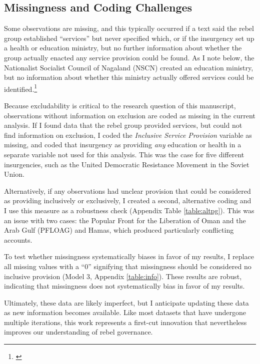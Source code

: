 \documentclass[12pt, letterpaper]{article}
\begin{document}
\subsection*{Missingness and Coding Challenges}  
Some observations are missing, and this typically occurred if a text said the rebel group established ``services'' but never specified which, or if the insurgency set up a health or education ministry, but no further information about whether the group actually enacted any service provision could be found. As I note below, the Nationalist Socialist Council of Nagaland (NSCN) created an education ministry, but no information about whether this ministry actually offered services could be identified.\footnote{\citealt{satp2014}} 

Because excludability is critical to the research question of this manuscript, observations without information on exclusion are coded as missing in the current analysis. If I found data that the rebel group provided services, but could not find information on exclusion, I coded the \textit{Inclusive Service Provision} variable as missing, and coded that insurgency as providing \textit{any} education or health in a separate variable not used for this analysis. This was the case for five different insurgencies, such as the United Democratic Resistance Movement in the Soviet Union. 

Alternatively, if any observations had unclear provision that could be considered as providing inclusively or exclusively, I created a second, alternative coding and I use this measure as a robustness check (Appendix Table \ref{table:altpg}). This was an issue with two cases: the Popular Front for the Liberation of Oman and the Arab Gulf (PFLOAG) and Hamas, which produced particularly conflicting accounts. 

To test whether missingness systematically biases in favor of my results, I replace all missing values with a ``0'' signifying that missingness should be considered no inclusive provision (Model 3, Appendix \autoref{table:info}). These results are robust, indicating that missingness does not systematically bias in favor of my results. 

Ultimately, these data are likely imperfect, but I anticipate updating these data as new information becomes available. Like most datasets that have undergone multiple iterations, this work represents a first-cut innovation that nevertheless improves our understanding of rebel governance.
\end{document}
